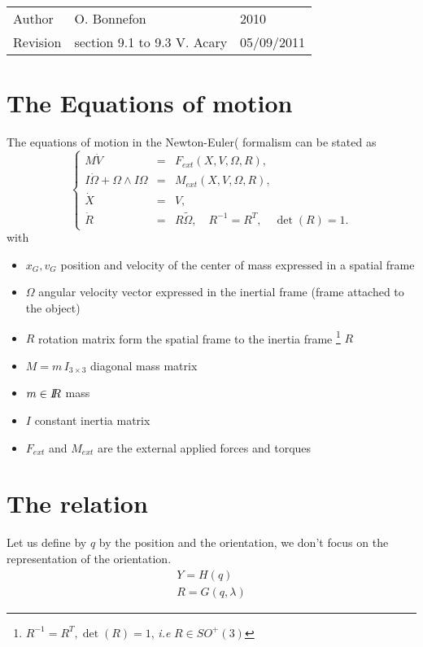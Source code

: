 
\begin{tabular}{lll}
  \centering
  Author &  O. Bonnefon &2010\\
  Revision& section 9.1 to 9.3 V. Acary&  05/09/2011
\end{tabular}
\section{The Equations of motion}

The equations of motion in the Newton-Euler(\cite{Wittenburg1977,Haug89} formalism can be stated as
\begin{equation}
  \label{eq:NewtonEuler}
  \left\{\begin{array}{rcl}
    M \dot V &=& F_{ext}(X, V, \Omega, R), \\
    I \dot \Omega + \Omega \wedge I\Omega &=&  M_{ext}(X,V, \Omega, R), \\
    \dot X &=& V, \\
    \dot R &=& R \tilde \Omega,\quad R^{-1}=R^T,\quad  \det(R)=1 .
\end{array}\right.
\end{equation}
with
\begin{itemize}
\item $x_G,v_G$ position and velocity of the center of mass expressed in a spatial frame
\item $\Omega$ angular velocity vector expressed in the inertial frame (frame attached to the object)
\item $R$ rotation matrix form the spatial frame to the inertia frame \footnote{$R^{-1}=R^T, \det(R)=1$, \textit{i.e} $ R\in SO^+(3)$} $R$ 
\item $M=m\,I_{3\times 3}$ diagonal mass matrix
\item $m \in \mbox{\rm $I\!\!R$}$ mass
\item $I$ constant inertia matrix
\item $F_{ext}$ and $ M_{ext}$ are the external applied forces and torques
\end{itemize}


\section{The relation}

Let us define by $q$ by  the position and the orientation, we don't focus on the  representation of the orientation.
\begin{equation}
\label{Relation}
\begin{array}{l}
Y=H(q)  \\
R=G(q,\lambda)
\end{array}
\end{equation}


